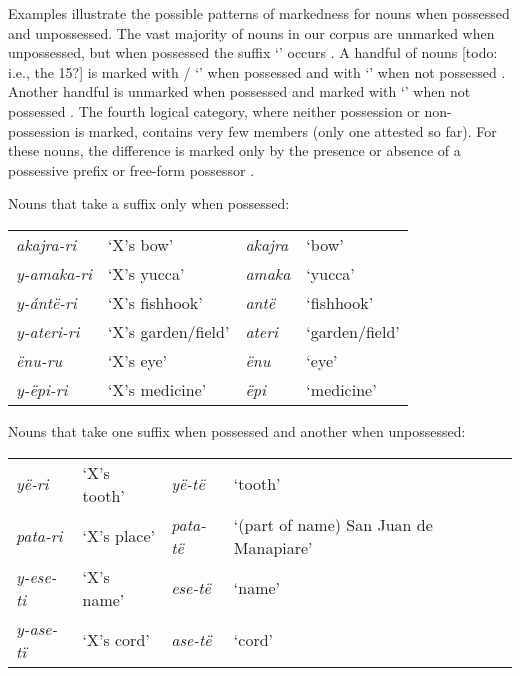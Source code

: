 \documentclass{memoir}
\begin{document}
Examples  illustrate the
possible patterns of markedness for nouns when possessed and
unpossessed. The vast majority of nouns in our corpus are unmarked when
unpossessed, but when possessed the suffix  `' occurs
. A handful of nouns {[}todo: i.e., the 15?{]} is
marked with / `' when possessed and with
 `' when not possessed .
Another handful is unmarked when possessed and marked with 
`' when not possessed . The fourth
logical category, where neither possession or non-possession is marked,
contains very few members (only one attested so far). For these nouns,
the difference is marked only by the presence or absence of a possessive
prefix or free-form possessor .

\ex\label{onlypossessed} Nouns that take a suffix only when possessed:

\begin{tabular}[t]{llll}

 \emph{akajra-ri} &          ‘X’s bow’ & \emph{akajra} &          ‘bow’ \\

\emph{y-amaka-ri} &        ‘X’s yucca’ &  \emph{amaka} &        ‘yucca’ \\
 \emph{y-ántë-ri} &     ‘X’s fishhook’ &   \emph{antë} &     ‘fishhook’ \\
\emph{y-ateri-ri} & ‘X’s garden/field’ &  \emph{ateri} & ‘garden/field’ \\
    \emph{ënu-ru} &          ‘X’s eye’ &    \emph{ënu} &          ‘eye’ \\
  \emph{y-ëpi-ri} &     ‘X’s medicine’ &    \emph{ëpi} &     ‘medicine’ \\

\end{tabular}
 \xe

\ex\label{diffpossessed} Nouns that take one suffix when possessed and
another when unpossessed:

\begin{tabular}[t]{llll}

   \emph{yë-ri} & ‘X’s tooth’ &   \emph{yë-të} &                                ‘tooth’ \\

 \emph{pata-ri} & ‘X’s place’ & \emph{pata-të} & ‘(part of name) San Juan de Manapiare’ \\
\emph{y-ese-ti} & ‘X’s name’  &  \emph{ese-të} &                                 ‘name’ \\
\emph{y-ase-tï} & ‘X’s cord’  &  \emph{ase-të} &                                 ‘cord’ \\

\end{tabular}
 \xe
\end{document}
